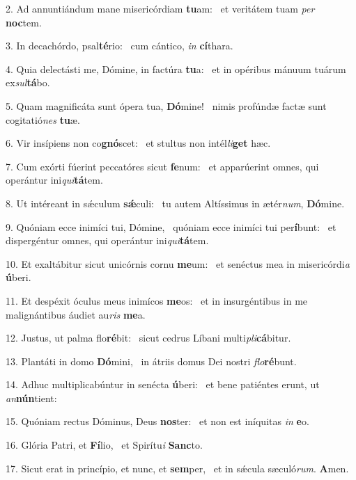 2. Ad annuntiándum mane misericórdiam \textbf{tu}am: \ast\  et veritátem tuam \textit{per} \textbf{noc}tem.\

3. In decachórdo, psal\textbf{té}rio: \ast\  cum cántico, \textit{in} \textbf{cí}thara.\

4. Quia delectásti me, Dómine, in factúra \textbf{tu}a: \ast\  et in opéribus mánuum tuárum ex\textit{sul}\textbf{tá}bo.\

5. Quam magnificáta sunt ópera tua, \textbf{Dó}mine! \ast\  nimis profúndæ factæ sunt cogitatió\textit{nes} \textbf{tu}æ.\

6. Vir insípiens non co\textbf{gnó}scet: \ast\  et stultus non intél\textit{li}\textbf{get} hæc.\

7. Cum exórti fúerint peccatóres sicut \textbf{fe}num: \ast\  et apparúerint omnes, qui operántur ini\textit{qui}\textbf{tá}tem.\

8. Ut intéreant in sǽculum \textbf{sǽ}culi: \ast\  tu autem Altíssimus in ætér\textit{num}, \textbf{Dó}mine.\

9. Quóniam ecce inimíci tui, Dómine, \dag\  quóniam ecce inimíci tui per\textbf{í}bunt: \ast\  et dispergéntur omnes, qui operántur ini\textit{qui}\textbf{tá}tem.\

10. Et exaltábitur sicut unicórnis cornu \textbf{me}um: \ast\  et senéctus mea in misericórdi\textit{a} \textbf{ú}beri.\

11. Et despéxit óculus meus inimícos \textbf{me}os: \ast\  et in insurgéntibus in me malignántibus áudiet au\textit{ris} \textbf{me}a.\

12. Justus, ut palma flo\textbf{ré}bit: \ast\  sicut cedrus Líbani multi\textit{pli}\textbf{cá}bitur.\

13. Plantáti in domo \textbf{Dó}mini, \ast\  in átriis domus Dei nostri \textit{flo}\textbf{ré}bunt.\

14. Adhuc multiplicabúntur in senécta \textbf{ú}beri: \ast\  et bene patiéntes erunt, ut \textit{an}\textbf{nún}tient:\

15. Quóniam rectus Dóminus, Deus \textbf{nos}ter: \ast\  et non est iníquitas \textit{in} \textbf{e}o.\

16. Glória Patri, et \textbf{Fí}lio, \ast\  et Spirítu\textit{i} \textbf{Sanc}to.\

17. Sicut erat in princípio, et nunc, et \textbf{sem}per, \ast\  et in sǽcula sæculó\textit{rum}. \textbf{A}men.\

